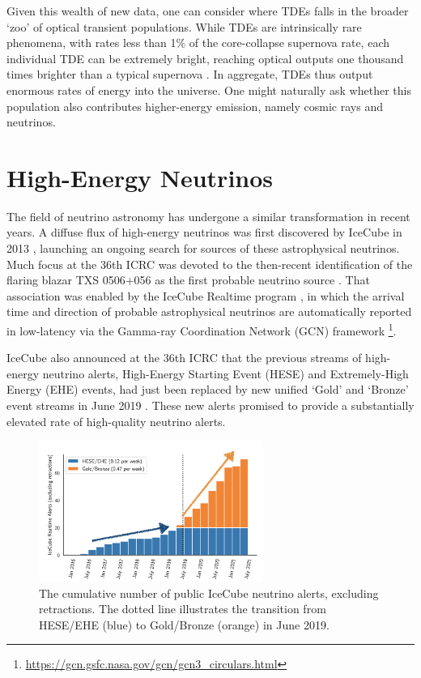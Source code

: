 \documentclass[a4paper,11pt]{article}
\begin{document}
Given this wealth of new data, one can consider where TDEs falls in the broader `zoo' of optical transient populations. 
While TDEs are intrinsically rare phenomena, with rates less than 1\% of the core-collapse supernova rate, each individual TDE can be extremely bright, reaching optical outputs one thousand times brighter than a typical supernova \cite{fang_20}. In aggregate, TDEs thus output enormous rates of energy into the universe. One might naturally ask whether this population also contributes higher-energy emission, namely cosmic rays and neutrinos.

\section{High-Energy Neutrinos}

The field of neutrino astronomy has undergone a similar transformation in recent years. A diffuse flux of high-energy neutrinos was first discovered by IceCube in 2013 \cite{ic_astro_13}, launching an ongoing search for sources of these astrophysical neutrinos. Much focus at the 36th ICRC was devoted to the then-recent identification of the flaring blazar TXS 0506+056 as the first probable neutrino source \cite{ic_txs_mm_18, kappes_19}. That association was enabled by the IceCube Realtime program \cite{ic_realtime_17}, in which the arrival time and direction of probable astrophysical neutrinos are automatically reported in low-latency via the Gamma-ray Coordination Network (GCN) framework \footnote{\url{https://gcn.gsfc.nasa.gov/gcn/gcn3_circulars.html}}.

IceCube also announced at the 36th ICRC that the previous streams of high-energy neutrino alerts, High-Energy Starting Event (HESE) and Extremely-High Energy (EHE)  events, had just been replaced by new unified `Gold' and `Bronze' event streams in June 2019 \cite{ic_realtime_19}. These new alerts promised to provide a substantially elevated rate of high-quality neutrino alerts. 

\begin{figure}[!ht]
	\centering \includegraphics[width=0.65\textwidth]{figures/ic_alerts}
	\caption{The cumulative number of public IceCube neutrino alerts, excluding retractions. The dotted line illustrates the transition from HESE/EHE (blue) to Gold/Bronze (orange) in June 2019.}
	\label{fig:ic_alerts}
\end{figure}
\end{document}
